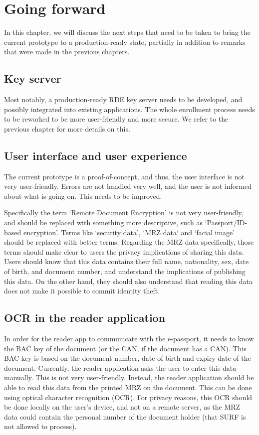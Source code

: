 \chapter{Going forward}
\label{ch:going-forward}
In this chapter, we will discuss the next steps that need to be taken to bring the current prototype to a production-ready state, partially in addition to remarks that were made in the previous chapters.

\section{Key server}
\label{sec:key-server}
Most notably, a production-ready RDE key server needs to be developed, and possibly integrated into existing applications.
The whole enrollment process needs to be reworked to be more user-friendly and more secure.
We refer to the previous chapter for more details on this.

\section{User interface and user experience}
\label{sec:user-interface-and-user-experience}
The current prototype is a proof-of-concept, and thus, the user interface is not very user-friendly.
Errors are not handled very well, and the user is not informed about what is going on.
This needs to be improved.

Specifically the term `Remote Document Encryption' is not very user-friendly, and should be replaced with something more descriptive, such as `Passport/ID-based encryption'.
Terms like `security data', `MRZ data` and `facial image' should be replaced with better terms.
Regarding the MRZ data specifically, those terms should make clear to users the privacy implications of sharing this data.
Users should know that this data contains their full name, nationality, sex, date of birth, and document number, and understand the implications of publishing this data.
On the other hand, they should also understand that reading this data does not make it possible to commit identity theft.

\section{OCR in the reader application}
\label{sec:ocr-in-the-reader-application}
In order for the reader app to communicate with the e-passport, it needs to know the BAC key of the document (or the CAN, if the document has a CAN).
This BAC key is based on the document number, date of birth and expiry date of the document.
Currently, the reader application asks the user to enter this data manually.
This is not very user-friendly.
Instead, the reader application should be able to read this data from the printed MRZ on the document.
This can be done using optical character recognition (OCR).
For privacy reasons, this OCR should be done locally on the user's device, and not on a remote server, as the MRZ data could contain the personal number of the document holder (that SURF is not allowed to process).


